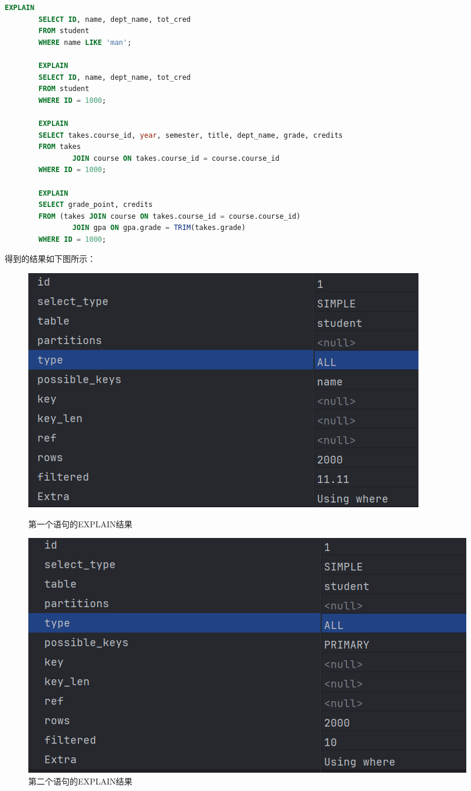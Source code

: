 \documentclass{article}
\begin{document}
	\begin{lstlisting}[language=sql, title=EXPLAIN ANALYZE Lab-2中的语句, tabsize=4]
		EXPLAIN
		SELECT ID, name, dept_name, tot_cred
		FROM student
		WHERE name LIKE 'man';
		
		EXPLAIN
		SELECT ID, name, dept_name, tot_cred
		FROM student
		WHERE ID = 1000;
		
		EXPLAIN
		SELECT takes.course_id, year, semester, title, dept_name, grade, credits
		FROM takes
				JOIN course ON takes.course_id = course.course_id
		WHERE ID = 1000;
		
		EXPLAIN
		SELECT grade_point, credits
		FROM (takes JOIN course ON takes.course_id = course.course_id)
				JOIN gpa ON gpa.grade = TRIM(takes.grade)
		WHERE ID = 1000;
	\end{lstlisting}
	
	得到的结果如下图所示：
	
	\begin{figure}[H]
		\centering
		\begin{minipage}[b]{0.45\textwidth}
			\includegraphics[width=\textwidth]{./images/12.EXPLAIN-1.png}
			\caption{第一个语句的EXPLAIN结果}
		\end{minipage}
		\hfill
		\begin{minipage}[b]{0.45\textwidth}
			\includegraphics[width=\textwidth]{./images/13.EXPLAIN-2.png}
			\caption{第二个语句的EXPLAIN结果}
		\end{minipage}
	\end{figure}
	
\end{document}

